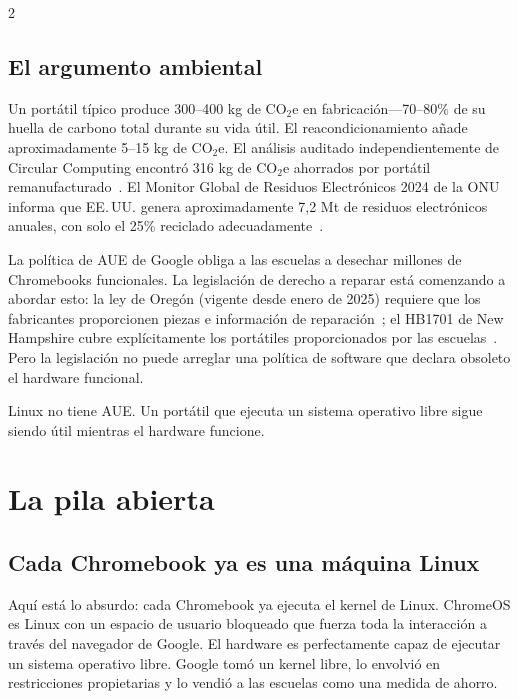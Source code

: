 \documentclass[11pt, a4paper]{article}
\begin{document}
\begin{multicols}{2}
\subsection{El argumento ambiental}

Un portátil típico produce 300--400 kg de CO$_2$e en fabricación---70--80\% de su huella de carbono total durante su vida útil. El reacondicionamiento añade aproximadamente 5--15 kg de CO$_2$e. El análisis auditado independientemente de Circular Computing encontró 316 kg de CO$_2$e ahorrados por portátil remanufacturado~\citep{circularcomputing2023carbon}. El Monitor Global de Residuos Electrónicos 2024 de la ONU informa que EE.\,UU. genera aproximadamente 7,2 Mt de residuos electrónicos anuales, con solo el 25\% reciclado adecuadamente~\citep{un2024ewaste}.

La política de AUE de Google obliga a las escuelas a desechar millones de Chromebooks funcionales. La legislación de derecho a reparar está comenzando a abordar esto: la ley de Oregón (vigente desde enero de 2025) requiere que los fabricantes proporcionen piezas e información de reparación~\citep{oregon2024repair}; el HB1701 de New Hampshire cubre explícitamente los portátiles proporcionados por las escuelas~\citep{newhampshire2024repair}. Pero la legislación no puede arreglar una política de software que declara obsoleto el hardware funcional.

Linux no tiene AUE. Un portátil que ejecuta un sistema operativo libre sigue siendo útil mientras el hardware funcione.


\section{La pila abierta}

\subsection{Cada Chromebook ya es una máquina Linux}

Aquí está lo absurdo: cada Chromebook ya ejecuta el kernel de Linux. ChromeOS es Linux con un espacio de usuario bloqueado que fuerza toda la interacción a través del navegador de Google. El hardware es perfectamente capaz de ejecutar un sistema operativo libre. Google tomó un kernel libre, lo envolvió en restricciones propietarias y lo vendió a las escuelas como una medida de ahorro.


\end{multicols}
\end{document}
